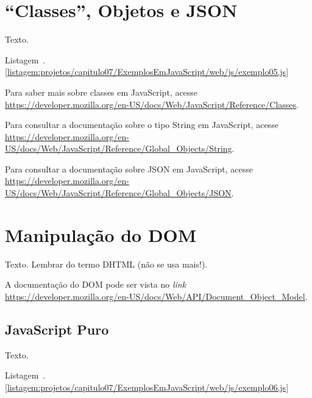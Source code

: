 \section{``Classes'', Objetos e JSON}

Texto.

Listagem~\thechapter.\ref{listagem:projetos/capitulo07/ExemplosEmJavaScript/web/js/exemplo05.js}


\begin{saibaMais}
    Para saber mais sobre classes em JavaScript, acesse \url{https://developer.mozilla.org/en-US/docs/Web/JavaScript/Reference/Classes}.
\end{saibaMais}

\begin{saibaMais}
    Para consultar a documentação sobre o tipo String em JavaScript, acesse \url{https://developer.mozilla.org/en-US/docs/Web/JavaScript/Reference/Global_Objects/String}.
\end{saibaMais}

\begin{saibaMais}
    Para consultar a documentação sobre JSON em JavaScript, acesse \url{https://developer.mozilla.org/en-US/docs/Web/JavaScript/Reference/Global_Objects/JSON}.
\end{saibaMais}


\section{Manipulação do DOM}

Texto. Lembrar do termo DHTML (não se usa mais!).

\begin{saibaMais}
    A documentação do DOM pode ser vista no \textit{link} \url{https://developer.mozilla.org/en-US/docs/Web/API/Document_Object_Model}.
\end{saibaMais}

\subsection{JavaScript Puro}

Texto.

Listagem~\thechapter.\ref{listagem:projetos/capitulo07/ExemplosEmJavaScript/web/js/exemplo06.js}


